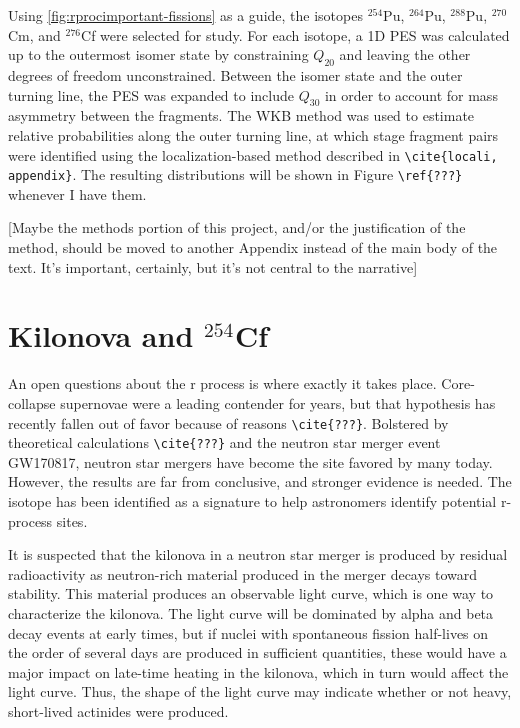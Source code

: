 Using \ref{fig:rprocimportant-fissions} as a guide, the isotopes $^{254}$Pu, $^{264}$Pu, $^{288}$Pu, $^{270}$Cm, and $^{276}$Cf were selected for study. For each isotope, a 1D PES was calculated up to the outermost isomer state by constraining $Q_{20}$ and leaving the other degrees of freedom unconstrained. Between the isomer state and the outer turning line, the PES was expanded to include $Q_{30}$ in order to account for mass asymmetry between the fragments. The WKB method was used to estimate relative probabilities along the outer turning line, at which stage fragment pairs were identified using the localization-based method described in \verb|\cite{locali, appendix}|. The resulting distributions will be shown in Figure \verb|\ref{???}| whenever I have them.

[Maybe the methods portion of this project, and/or the justification of the method, should be moved to another Appendix instead of the main body of the text. It's important, certainly, but it's not central to the narrative]

\section{Kilonova and $^{254}$Cf}

An open questions about the r process is where exactly it takes place. Core-collapse supernovae were a leading contender for years, but that hypothesis has recently fallen out of favor because of reasons \verb|\cite{???}|. Bolstered by theoretical calculations \verb|\cite{???}| and the neutron star merger event GW170817, neutron star mergers have become the site favored by many today. However, the results are far from conclusive, and stronger evidence is needed. The isotope {\Cf} has been identified as a signature to help astronomers identify potential r-process sites.

It is suspected that the kilonova in a neutron star merger is produced by residual radioactivity as neutron-rich material produced in the merger decays toward stability. This material produces an observable light curve, which is one way to characterize the kilonova. The light curve will be dominated by alpha and beta decay events at early times, but if nuclei with spontaneous fission half-lives on the order of several days are produced in sufficient quantities, these would have a major impact on late-time heating in the kilonova, which in turn would affect the light curve. Thus, the shape of the light curve may indicate whether or not heavy, short-lived actinides were produced.

